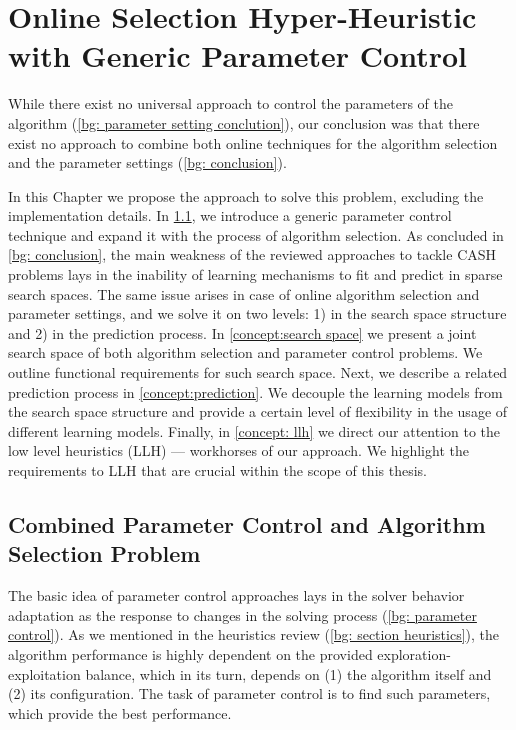 \chapter{Online Selection Hyper-Heuristic with Generic Parameter Control}\label{Concept description}
While there exist no universal approach to control the parameters of the algorithm (\cref{bg: parameter setting conclution}), our conclusion was that there exist no approach to combine both online techniques for the algorithm selection and the parameter settings (\cref{bg: conclusion}). 

In this Chapter we propose the approach to solve this problem, excluding the implementation details. In \cref{concept:parameter control}, we introduce a generic parameter control technique and expand it with the process of algorithm selection. As concluded in \cref{bg: conclusion}, the main weakness of the reviewed approaches to tackle CASH problems lays in the inability of learning mechanisms to fit and predict in sparse search spaces. The same issue arises in case of online algorithm selection and parameter settings, and we solve it on two levels: 1) in the search space structure and 2) in the prediction process. In \cref{concept:search space} we present a joint search space of both algorithm selection and parameter control problems. We outline functional requirements for such search space. Next, we describe a related prediction process in \cref{concept:prediction}. We decouple the learning models from the search space structure and provide a certain level of flexibility in the usage of different learning models.
Finally, in \cref{concept: llh} we direct our attention to the low level heuristics (LLH) — workhorses of our approach. We highlight the requirements to LLH that are crucial within the scope of this thesis.


\section{Combined Parameter Control and Algorithm Selection Problem}\label{concept:parameter control}
The basic idea of parameter control approaches lays in the solver behavior adaptation as the response to changes in the solving process (\cref{bg: parameter control}). As we mentioned in the heuristics review (\cref{bg: section heuristics}), the algorithm performance is highly dependent on the provided exploration-exploitation balance, which in its turn, depends on (1) the algorithm itself and (2) its configuration. The task of parameter control is to find such parameters, which provide the best performance.

